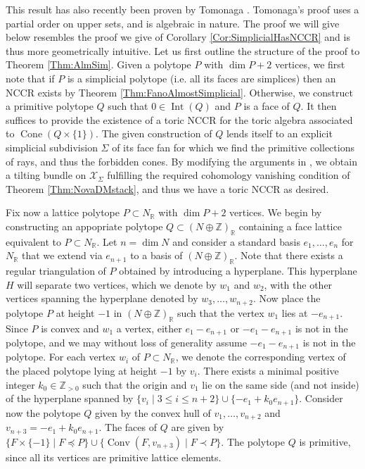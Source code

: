 \documentclass[reqno, 12pt]{amsart}
\theoremstyle{definition}
\numberwithin{equation}{section}
\newcommand{\Z}{\mathbb{Z}}
\newcommand{\R}{\mathbb{R}}
\newcommand{\cone}{\operatorname{Cone}}
\newcommand{\conv}{\operatorname{Conv}}
\begin{document}
This result has also recently been proven by Tomonaga \cite{Tomo25}. Tomonaga's proof uses a partial order on upper sets, and is algebraic in nature. The proof we will give below resembles the proof we give of Corollary \ref{Cor:SimplicialHasNCCR} and is thus more geometrically intuitive. 
Let us first outline the structure of the proof to Theorem \ref{Thm:AlmSim}. Given a polytope $P$ with $\dim P+2$ vertices, we first note that if $P$ is a simplicial polytope (i.e. all its faces are simplices) then an NCCR exists by Theorem \ref{Thm:FanoAlmostSimplicial}. Otherwise, we construct a primitive polytope $Q$ such that $0\in \operatorname{Int}(Q)$ and $P$ is a face of $Q$. It then suffices to provide the existence of a toric NCCR for the toric algebra associated to $\cone(Q\times\{1\})$. The given construction of $Q$ lends itself to an explicit simplicial subdivision $\Sigma$ of its face fan for which we find the primitive collections of rays, and thus the forbidden cones. By modifying the arguments in \cite[\S 5]{BH09}, we obtain a tilting bundle on $\mathcal{X}_\Sigma$ fulfilling the required cohomology vanishing condition of Theorem \ref{Thm:NovaDMstack}, and thus we have a toric NCCR as desired.


Fix now a lattice polytope $P\subset N_\R$ with $\dim P+2$ vertices. We begin by constructing an appopriate polytope $Q\subset (N\oplus \Z)_\R$ containing a face lattice equivalent to $P\subset N_\R$. Let $n=\dim N$ and consider a standard basis $e_1,\dots, e_n$ for $N_\R$ that we extend via $e_{n+1}$ to a basis of $(N\oplus \Z)_\R$. Note that there exists a regular triangulation of $P$ obtained by introducing a hyperplane. This hyperplane $H$ will separate two vertices, which we denote by $w_1$ and $w_2$, with the other vertices spanning the hyperplane denoted by $w_3,\dots,w_{n+2}$. Now place the polytope $P$ at height $-1$ in $(N\oplus \Z)_\R$ such that the vertex $w_1$ lies at $-e_{n+1}$.\\

Since $P$ is convex and $w_1$ a vertex, either $e_1-e_{n+1}$ or $-e_1-e_{n+1}$ is not in the polytope, and we may without loss of generality assume $-e_1-e_{n+1}$ is not in the polytope. For each vertex $w_i$ of $P\subset N_\R$, we denote the corresponding vertex of the placed polytope lying at height $-1$ by $v_i$. 
There exists a minimal positive integer $k_0\in \Z_{>0}$ such that the origin and $v_1$ lie on the same side (and not inside) of the hyperplane spanned by  $\{v_i\mid 3\le i\le n+2\}\cup \{-e_1+k_0 e_{n+1}\}$. Consider now the polytope $Q$ given by the convex hull of $v_1,\dots, v_{n+2}$ and $v_{n+3}=-e_1+k_0e_{n+1}$. The faces of $Q$ are given by $\{F\times \{-1\}\mid F\preceq P\}\cup\{\conv(F, v_{n+3})\mid F\prec P\}$. The polytope $Q$ is primitive, since all its vertices are primitive lattice elements.\\
\end{document}
